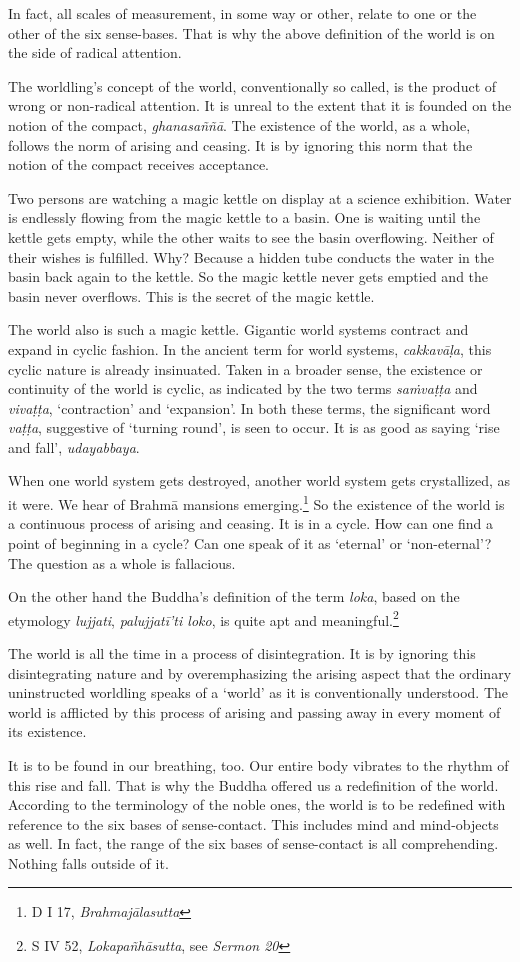 In fact, all scales of measurement, in some way or other, relate to one or the other of the six sense-bases. That is why the above definition of the world is on the side of radical attention.

The worldling's concept of the world, conventionally so called, is the product of wrong or non-radical attention. It is unreal to the extent that it is founded on the notion of the compact, \emph{ghanasaññā}. The existence of the world, as a whole, follows the norm of arising and ceasing. It is by ignoring this norm that the notion of the compact receives acceptance.

Two persons are watching a magic kettle on display at a science exhibition. Water is endlessly flowing from the magic kettle to a basin. One is waiting until the kettle gets empty, while the other waits to see the basin overflowing. Neither of their wishes is fulfilled. Why? Because a hidden tube conducts the water in the basin back again to the kettle. So the magic kettle never gets emptied and the basin never overflows. This is the secret of the magic kettle.

The world also is such a magic kettle. Gigantic world systems contract and expand in cyclic fashion. In the ancient term for world systems, \emph{cakkavāḷa}, this cyclic nature is already insinuated. Taken in a broader sense, the existence or continuity of the world is cyclic, as indicated by the two terms \emph{saṁvaṭṭa} and \emph{vivaṭṭa}, `contraction' and `expansion'. In both these terms, the significant word \emph{vaṭṭa}, suggestive of `turning round', is seen to occur. It is as good as saying `rise and fall', \emph{udayabbaya}.

When one world system gets destroyed, another world system gets crystallized, as it were. We hear of Brahmā mansions emerging.\footnote{D I 17, \emph{Brahmajālasutta}} So the existence of the world is a continuous process of arising and ceasing. It is in a cycle. How can one find a point of beginning in a cycle? Can one speak of it as `eternal' or `non-eternal'? The question as a whole is fallacious.

On the other hand the Buddha's definition of the term \emph{loka}, based on the etymology \emph{lujjati}, \emph{palujjatī'ti loko}, is quite apt and meaningful.\footnote{S IV 52, \emph{Lokapañhāsutta}, see \emph{Sermon 20}}

The world is all the time in a process of disintegration. It is by ignoring this disintegrating nature and by overemphasizing the arising aspect that the ordinary uninstructed worldling speaks of a `world' as it is conventionally understood. The world is afflicted by this process of arising and passing away in every moment of its existence.

It is to be found in our breathing, too. Our entire body vibrates to the rhythm of this rise and fall. That is why the Buddha offered us a redefinition of the world. According to the terminology of the noble ones, the world is to be redefined with reference to the six bases of sense-contact. This includes mind and mind-objects as well. In fact, the range of the six bases of sense-contact is all comprehending. Nothing falls outside of it.
